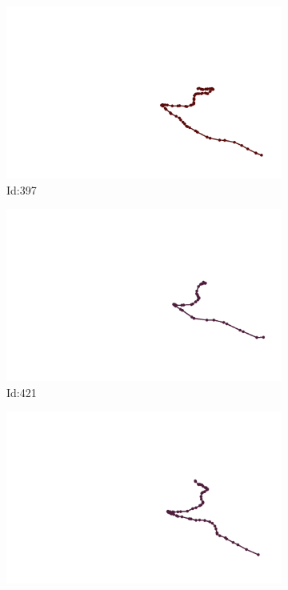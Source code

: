 \documentclass[12pt,twoside]{report}
\begin{document}
\begin{figure}
\centering
\begin{subfigure}[b]{0.20\textwidth}
\centering
\includegraphics[width=\textwidth]{../../trajectories/397.png}
\caption{Id:397}
\end{subfigure}
\begin{subfigure}[b]{0.20\textwidth}
\centering
\includegraphics[width=\textwidth]{../../trajectories/421.png}
\caption{Id:421}
\end{subfigure}
\begin{subfigure}[b]{0.20\textwidth}
\centering
\includegraphics[width=\textwidth]{../../trajectories/435.png}

\end{subfigure}
\end{figure}
\end{document}
